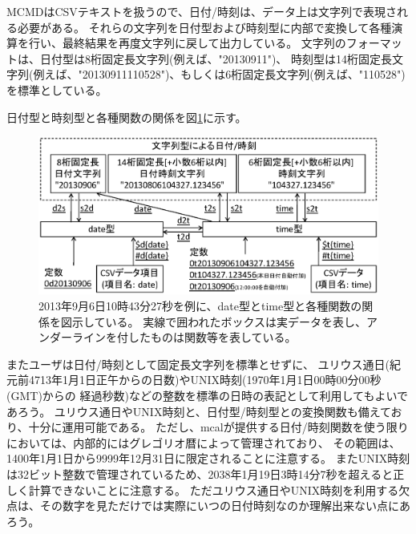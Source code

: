 MCMDはCSVテキストを扱うので、日付/時刻は、データ上は文字列で表現される必要がある。
それらの文字列を日付型および時刻型に内部で変換して各種演算を行い、最終結果を再度文字列に戻して出力している。
文字列のフォーマットは、日付型は8桁固定長文字列(例えば、"20130911")、
時刻型は14桁固定長文字列(例えば、"20130911110528")、もしくは6桁固定長文字列(例えば、"110528")を標準としている。

日付型と時刻型と各種関数の関係を図\ref{fig:mcal_datetime}に示す。

\begin{figure}[hbt]
\begin{center}
\includegraphics[scale=.50]{figure/datetime/datetime.eps}
\caption{2013年9月6日10時43分27秒を例に、date型とtime型と各種関数の関係を図示している。
実線で囲われたボックスは実データを表し、アンダーラインを付したものは関数等を表している。\label{fig:mcal_datetime}}
\end{center}
\end{figure}

またユーザは日付/時刻として固定長文字列を標準とせずに、
ユリウス通日(紀元前4713年1月1日正午からの日数)やUNIX時刻(1970年1月1日00時00分00秒(GMT)からの
経過秒数)などの整数を標準の日時の表記として利用してもよいであろう。
ユリウス通日やUNIX時刻と、日付型/時刻型との変換関数も備えており、十分に運用可能である。
ただし、mcalが提供する日付/時刻関数を使う限りにおいては、内部的にはグレゴリオ暦によって管理されており、
その範囲は、1400年1月1日から9999年12月31日に限定されることに注意する。
またUNIX時刻は32ビット整数で管理されているため、2038年1月19日3時14分7秒を超えると正しく計算できないことに注意する。
ただユリウス通日やUNIX時刻を利用する欠点は、その数字を見ただけでは実際にいつの日付時刻なのか理解出来ない点にあろう。

%
